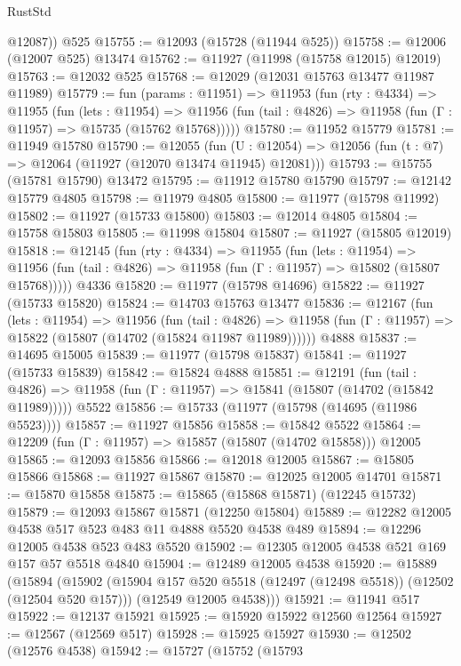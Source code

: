 \begin{lexlean}{RustStd}
\begin{coremodule}
        @12087))
    @525
@15755 := @12093 (@15728 (@11944 @525))
@15758 := @12006 (@12007 @525) @13474
@15762 := @11927 (@11998 (@15758 @12015) @12019)
@15763 := @12032 @525
@15768 := @12029 (@12031 @15763 @13477 @11987 @11989)
@15779 := fun (params : @11951) =>
  @11953
    (fun (rty : @4334) =>
    @11955
      (fun (lets : @11954) =>
      @11956 (fun (tail : @4826) => @11958 (fun (Γ : @11957) => @15735 (@15762 @15768)))))
@15780 := @11952 @15779
@15781 := @11949 @15780
@15790 := @12055
    (fun (U : @12054) => @12056 (fun (t : @7) => @12064 (@11927 (@12070 @13474 @11945) @12081)))
@15793 := @15755 (@15781 @15790) @13472
@15795 := @11912 @15780 @15790
@15797 := @12142 @15779 @4805
@15798 := @11979 @4805
@15800 := @11977 (@15798 @11992)
@15802 := @11927 (@15733 @15800)
@15803 := @12014 @4805
@15804 := @15758 @15803
@15805 := @11998 @15804
@15807 := @11927 (@15805 @12019)
@15818 := @12145
    (fun (rty : @4334) =>
    @11955
      (fun (lets : @11954) =>
      @11956 (fun (tail : @4826) => @11958 (fun (Γ : @11957) => @15802 (@15807 @15768)))))
    @4336
@15820 := @11977 (@15798 @14696)
@15822 := @11927 (@15733 @15820)
@15824 := @14703 @15763 @13477
@15836 := @12167
    (fun (lets : @11954) =>
    @11956
      (fun (tail : @4826) =>
      @11958 (fun (Γ : @11957) => @15822 (@15807 (@14702 (@15824 @11987 @11989))))))
    @4888
@15837 := @14695 @15005
@15839 := @11977 (@15798 @15837)
@15841 := @11927 (@15733 @15839)
@15842 := @15824 @4888
@15851 := @12191
    (fun (tail : @4826) => @11958 (fun (Γ : @11957) => @15841 (@15807 (@14702 (@15842 @11989)))))
    @5522
@15856 := @15733 (@11977 (@15798 (@14695 (@11986 @5523))))
@15857 := @11927 @15856
@15858 := @15842 @5522
@15864 := @12209 (fun (Γ : @11957) => @15857 (@15807 (@14702 @15858))) @12005
@15865 := @12093 @15856
@15866 := @12018 @12005
@15867 := @15805 @15866
@15868 := @11927 @15867
@15870 := @12025 @12005 @14701
@15871 := @15870 @15858
@15875 := @15865 (@15868 @15871) (@12245 @15732)
@15879 := @12093 @15867 @15871 (@12250 @15804)
@15889 := @12282 @12005 @4538 @517 @523 @483 @11 @4888 @5520 @4538 @489
@15894 := @12296 @12005 @4538 @523 @483 @5520
@15902 := @12305 @12005 @4538 @521 @169 @157 @57 @5518 @4840
@15904 := @12489 @12005 @4538
@15920 := @15889
    (@15894
      (@15902
        (@15904 @157 @520 @5518 (@12497 (@12498 @5518)) (@12502 (@12504 @520 @157)))
        (@12549 @12005 @4538)))
@15921 := @11941 @517
@15922 := @12137 @15921
@15925 := @15920 @15922 @12560 @12564
@15927 := @12567 (@12569 @517)
@15928 := @15925 @15927
@15930 := @12502 (@12576 @4538)
@15942 := @15727
    (@15752
      (@15793

\end{coremodule}
\end{lexlean}
